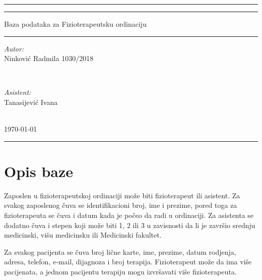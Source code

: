 \documentclass{article}
\begin{document}
	
\begin{titlepage} 
	\centering 
	
	\rule{\textwidth}{1pt}
	
	\vspace{2pt}\vspace{-\baselineskip} 
	
	\rule{\textwidth}{0.4pt}
	
	\vspace{0.025\textheight}

	{\Huge Baza podataka za Fizioterapeutsku ordinaciju}
	
	\vspace{0.020\textheight}
	
	\rule{0.5\textwidth}{1pt}
	
	\vspace{0.5\textheight}
	
	\begin{minipage}{0.4\textwidth}
		\begin{flushleft} \large
			\emph{Autor:}\\
			Ninković Radmila 1030/2018
		\end{flushleft}
	\end{minipage}
	~
	\begin{minipage}{0.4\textwidth}
		\begin{flushright} \large
			\emph{Asistent:} \\
			Tanasijević Ivana
		\end{flushright}
	\end{minipage}\\[2cm]

	{\large \today}\\[2cm]
	
	\rule{1\textwidth}{1.5pt}
	
\end{titlepage}

\newpage
\section{Opis baze}

Zaposlen u fizioterapeutskoj ordinaciji može biti fizioterapeut ili asistent. Za svakog zaposlenog čuva se identifikacioni broj, ime i prezime, pored toga za fizioterapeuta se čuva i datum kada je počeo da radi u ordinaciji. Za asistenta se dodatno čuva i stepen koji može biti 1, 2 ili 3 u zavisnosti da li je završio srednju medicinski, višu medicinsku ili Medicinski fakultet.

Za svakog pacijenta se čuva broj lične karte, ime, prezime, datum rodjenja, adresa, telefon, e-mail, dijagnoza i broj terapija. Fizioterapeut može da ima više pacijenata, a jednom pacijentu terapiju mogu izvršavati više fizioterapeuta.
\end{document}
